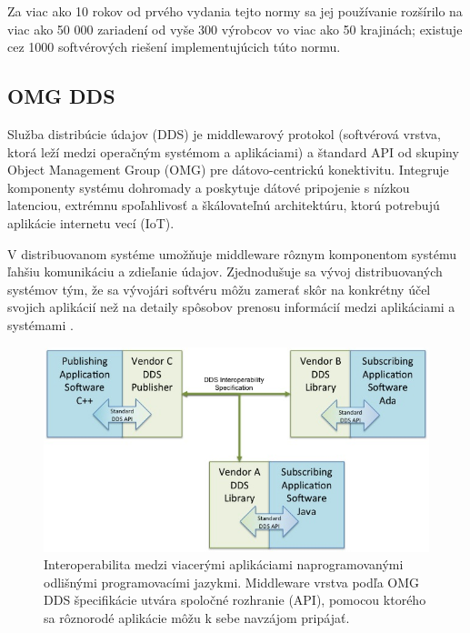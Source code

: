 \documentclass[]{tukediphc}
\begin{document}
Za viac ako 10 rokov od prvého vydania tejto normy sa jej používanie rozšírilo na viac ako 50 000 zariadení od vyše 300 výrobcov vo viac ako 50 krajinách; existuje cez 1000 softvérových riešení implementujúcich túto normu.

\subsection{OMG DDS}

Služba distribúcie údajov (DDS) je middlewarový protokol (softvérová vrstva, ktorá leží medzi operačným systémom a aplikáciami) a štandard API od skupiny Object Management Group (OMG) pre dátovo-centrickú konektivitu. Integruje komponenty systému dohromady a poskytuje dátové pripojenie s nízkou latenciou, extrémnu spoľahlivosť a škálovateľnú architektúru, ktorú potrebujú aplikácie internetu vecí (IoT).

V distribuovanom systéme umožňuje middleware rôznym komponentom systému ľahšiu komunikáciu a zdieľanie údajov. Zjednodušuje sa vývoj distribuovaných systémov tým, že sa vývojári softvéru môžu zamerať skôr na konkrétny účel svojich aplikácií než na detaily spôsobov prenosu informácií medzi aplikáciami a systémami \citep{ddsfoundation}.

\begin{figure}[h!]
	\centering
	\includegraphics[width=.8\textwidth,angle=0]{figures/omg-dds-interoperability.jpg}
	\caption{Interoperabilita medzi viacerými aplikáciami naprogramovanými odlišnými programovacími jazykmi. Middleware vrstva podľa OMG DDS špecifikácie utvára spoločné rozhranie (API), pomocou ktorého sa rôznorodé aplikácie môžu k sebe navzájom pripájať.}
\end{figure}

%

%
\end{document}
